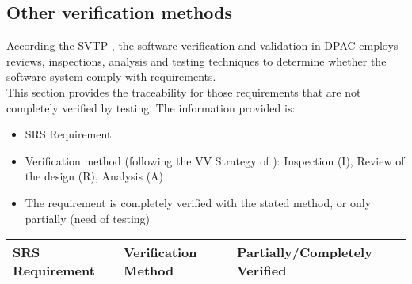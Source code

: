 \documentclass[CUx,lsstdraft,STS]{lsstdoc}
\begin{document}
\subsection{Other verification methods}
According the SVTP , the software verification and validation in DPAC employs reviews, inspections, analysis and testing techniques
to determine whether the software system comply with requirements.\\
This section provides the traceability for those requirements that are not completely verified by testing. The information provided is:
\begin{itemize}
\item SRS Requirement
\item Verification method (following the VV Strategy of ): Inspection (I), Review of the design (R), Analysis (A)
\item The requirement is completely verified with the stated method, or only partially (need of testing)
\end{itemize}

\begin{longtable}{|p{}|p{}|p{}|
}\hline
{\bf SRS Requirement} & {\bf Verification Method} & {\bf Partially/Completely Verified}
\\\hline
\end{longtable} \normalsize
\end{document}
